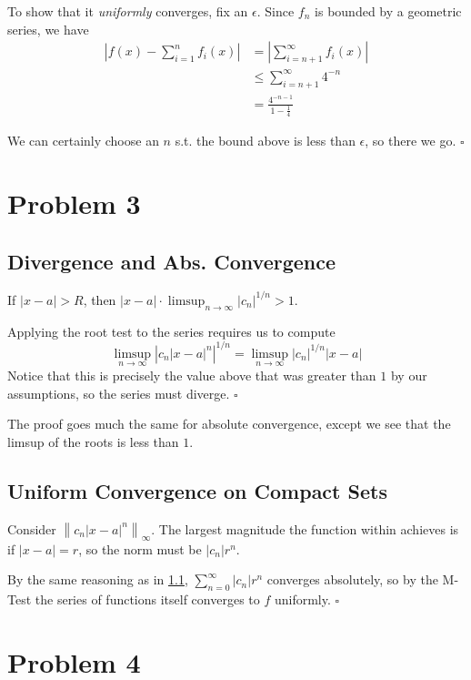 \documentclass[12pt]{article}
\newcommand{\norm}[1]{\left\lVert#1\right\rVert}
\begin{document}
To show that it \textit{uniformly} converges, fix an $\epsilon$.
Since $f_n$ is bounded by a geometric series, we have
\begin{align*}
    \left|f(x)-\sum_{i=1}^n f_i(x)\right|
    &= \left|\sum_{i=n+1}^\infty f_i(x)\right| \\
    &\le \sum_{i=n+1}^\infty 4^{-n} \\
    &= \frac{4^{-n-1}}{1-\frac{1}{4}}
\end{align*}

We can certainly choose an $n$ s.t. the bound above is less than $\epsilon$, so there we go. $\square$

\section{Problem 3}

\subsection{Divergence and Abs. Convergence}\label{sec:p3p1}

If $|x-a| > R$, then $|x-a| \cdot \limsup_{n \to \infty} |c_n|^{1/n} > 1$.

Applying the root test to the series requires us to compute
\[\limsup_{n \to \infty} \left|c_n|x-a|^n\right|^{1/n}
=\limsup_{n \to \infty} |c_n|^{1/n}|x-a|\]
Notice that this is precisely the value above that was greater
than $1$ by our assumptions, so the series must diverge. $\square$

The proof goes much the same for absolute convergence,
except we see that the limsup of the roots is less than $1$.

\subsection{Uniform Convergence on Compact Sets}

Consider $\norm{c_n |x-a|^n}_\infty$.
The largest magnitude the function within achieves is if $|x-a|=r$, so the norm must be $|c_n|r^n$.

By the same reasoning as in \ref{sec:p3p1}, $\sum_{n=0}^\infty |c_n|r^n$ converges absolutely,
so by the M-Test the series of functions itself converges to $f$ uniformly. $\square$

\pagebreak

\section{Problem 4}
\end{document}

